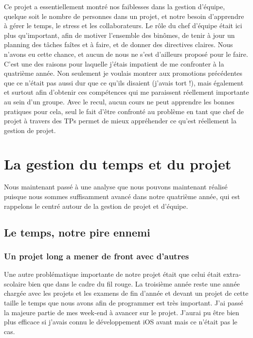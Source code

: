 \documentclass{article}
\begin{document}
		Ce projet a essentiellement montré nos faiblesses dans la gestion d'équipe, quelque soit le nombre de personnes dans un projet, et notre besoin d'apprendre à gérer le temps, le stress et les collaborateurs. Le rôle du chef d'équipe était ici plus qu'important, afin de motiver l'ensemble des binômes, de tenir à jour un planning des tâches faîtes et à faire, et de donner des directives claires. Nous n'avons eu cette chance, et aucun de nous ne s'est d'ailleurs proposé pour le faire. \\
		
		C'est une des raisons pour laquelle j'étais impatient de me confronter à la quatrième année. Non seulement je voulais montrer aux promotions précédentes que ce n'était pas aussi dur que ce qu'ils disaient (j'avais tort !), mais également et surtout afin d'obtenir ces compétences qui me paraissent réellement importante au sein d'un groupe. Avec le recul, aucun cours ne peut apprendre les bonnes pratiques pour cela, seul le fait d'être confronté au problème en tant que chef de projet à travers des TPs permet de mieux appréhender ce qu'est réellement la gestion de projet.


\section{La gestion du temps et du projet}
		Nous maintenant passé à une analyse que nous pouvons maintenant réalisé puisque nous sommes suffisamment avancé dans notre quatrième année, qui est rappelons le centré autour de la gestion de projet et d'équipe.
		
	\subsection{Le temps, notre pire ennemi}
		\subsubsection{Un projet long a mener de front avec d'autres}
		Une autre problématique importante de notre projet était que celui était extra-scolaire bien que dans le cadre du fil rouge. La troisième année reste une année chargée avec les projets et les examens de fin d'année et devant un projet de cette taille le temps que nous avons afin de programmer est très important. J'ai passé la majeure partie de mes week-end à avancer sur le projet. J'aurai pu être bien plus efficace si j'avais connu le développement iOS avant mais ce n'était pas le cas.
\end{document}
